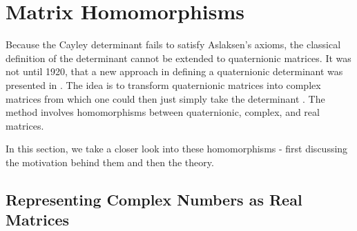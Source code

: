 \section{Matrix Homomorphisms}

Because the Cayley determinant fails to satisfy Aslaksen's axioms, the classical definition of the determinant cannot be extended to quaternionic matrices. It was not until 1920, that a new approach in defining a quaternionic determinant was presented in \cite{aslaksen}. The idea is to transform quaternionic matrices into complex matrices from which one could then just simply take the determinant \cite{aslaksen}. The method involves homomorphisms between quaternionic, complex, and real matrices. 

 In this section, we take a closer look into these homomorphisms - first discussing the motivation behind them and then the theory. 

\subsection{Representing Complex Numbers as Real Matrices}

